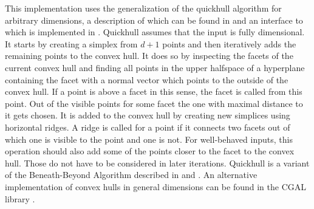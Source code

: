 This implementation uses the generalization of the quickhull algorithm for arbitrary dimensions, a description of which can be found in \cite{barber1996quickhull} and an interface to which is implemented in .
Quickhull assumes that the input is fully dimensional.
It starts by creating a simplex from $d + 1$ points and then iteratively adds the remaining points to the convex hull.
It does so by inspecting the facets of the current convex hull and finding all points in the upper halfspace of a hyperplane containing the facet with a normal vector which points to the outside of the convex hull.
If a point is above a facet in this sense, the facet is called  from this point.
Out of the visible points for some facet the one with maximal distance to it gets chosen.
It is added to the convex hull by creating new simplices using horizontal ridges.
A ridge is called  for a point if it connects two facets out of which one is visible to the point and one is not.
For well-behaved inputs, this operation should also add some of the points closer to the facet to the convex hull.
Those do not have to be considered in later iterations.
Quickhull is a variant of the Beneath-Beyond Algorithm described in \cite{grunbaum1963measures} and \cite{clarkson1989applications}.
An alternative implementation of convex hulls in general dimensions can be found in the CGAL library \cite{cgal:eb-15a}.

